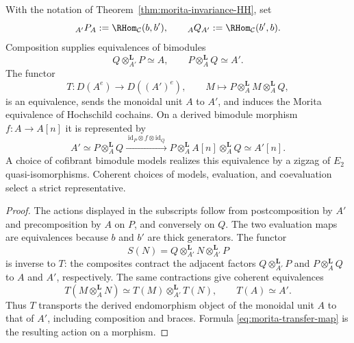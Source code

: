 \begin{proposition}
\label{prop:explicit-morita-transfer}
With the notation of Theorem~\ref{thm:morita-invariance-HH}, set
\[
 {}_{A'}P_A:=\RHom_{\mathcal C}(b,b'),
 \qquad
 {}_A Q_{A'}:=\RHom_{\mathcal C}(b',b).
\]
Composition supplies equivalences of bimodules
\[
 Q\otimes_{A'}^{\mathbf L}P\simeq A,
 \qquad
 P\otimes_A^{\mathbf L}Q\simeq A'.
\]
The functor
\[
 T\colon D(A^e)\longrightarrow D((A')^e),
 \qquad
 M\longmapsto P\otimes_A^{\mathbf L}M\otimes_A^{\mathbf L}Q,
\]
is an equivalence, sends the monoidal unit $A$ to $A'$, and induces
the Morita equivalence of Hochschild cochains.  On a derived
bimodule morphism $f\colon A\to A[n]$ it is represented by
\begin{equation}\label{eq:morita-transfer-map}
 A'\simeq P\otimes_A^{\mathbf L}Q
 \xrightarrow{\;\mathrm{id}_P\otimes f\otimes\mathrm{id}_Q\;}
 P\otimes_A^{\mathbf L}A[n]\otimes_A^{\mathbf L}Q
 \simeq A'[n].
\end{equation}
A choice of cofibrant bimodule models realizes this equivalence by a
zigzag of $E_2$ quasi-isomorphisms.  Coherent choices of models,
evaluation, and coevaluation select a strict representative.
\end{proposition}

\begin{proof}
The actions displayed in the subscripts follow from postcomposition
by $A'$ and precomposition by $A$ on $P$, and conversely on $Q$.
The two evaluation maps are equivalences because $b$ and $b'$ are
thick generators.  The functor
\[
 S(N)=Q\otimes_{A'}^{\mathbf L}N\otimes_{A'}^{\mathbf L}P
\]
is inverse to $T$: the composites contract the adjacent factors
$Q\otimes_{A'}^{\mathbf L}P$ and
$P\otimes_A^{\mathbf L}Q$ to $A$ and $A'$, respectively.  The same
contractions give coherent equivalences
\[
 T(M\otimes_A^{\mathbf L}N)
 \simeq
 T(M)\otimes_{A'}^{\mathbf L}T(N),
 \qquad T(A)\simeq A'.
\]
Thus $T$ transports the derived endomorphism object of the monoidal
unit $A$ to that of $A'$, including composition and braces.  Formula
\eqref{eq:morita-transfer-map} is the resulting action on a morphism.
\end{proof}

